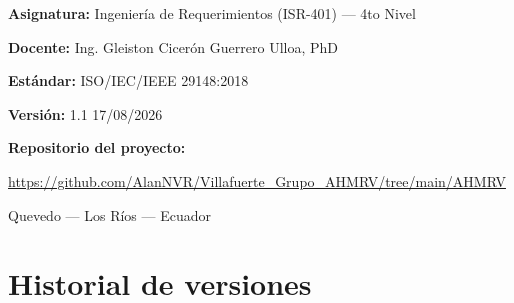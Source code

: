 \documentclass[11pt,a4paper]{article}
\begin{document}
\begin{titlepage}
\vspace{0.9cm}
{\bfseries Asignatura:} Ingeniería de Requerimientos (ISR-401) --- 4to Nivel\par
{\bfseries Docente:} Ing. Gleiston Cicerón Guerrero Ulloa, PhD\par
{\bfseries Estándar:} ISO/IEC/IEEE 29148:2018\par
{\bfseries Versión:} 1.1  17/08/2026

\vspace{0.8cm}
{\bfseries Repositorio del proyecto:}\par
\url{https://github.com/AlanNVR/Villafuerte_Grupo_AHMRV/tree/main/AHMRV}

\vfill
{\small Quevedo --- Los Ríos --- Ecuador\par}
\end{titlepage}

\section*{Historial de versiones}
\end{document}
